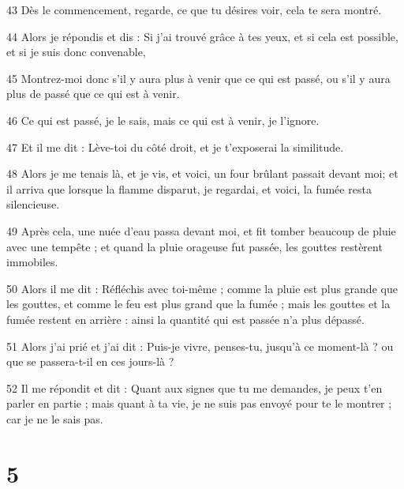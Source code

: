 \par 43 Dès le commencement, regarde, ce que tu désires voir, cela te sera montré.
\par 44 Alors je répondis et dis : Si j'ai trouvé grâce à tes yeux, et si cela est possible, et si je suis donc convenable,
\par 45 Montrez-moi donc s'il y aura plus à venir que ce qui est passé, ou s'il y aura plus de passé que ce qui est à venir.
\par 46 Ce qui est passé, je le sais, mais ce qui est à venir, je l'ignore.
\par 47 Et il me dit : Lève-toi du côté droit, et je t'exposerai la similitude.
\par 48 Alors je me tenais là, et je vis, et voici, un four brûlant passait devant moi; et il arriva que lorsque la flamme disparut, je regardai, et voici, la fumée resta silencieuse.
\par 49 Après cela, une nuée d'eau passa devant moi, et fit tomber beaucoup de pluie avec une tempête ; et quand la pluie orageuse fut passée, les gouttes restèrent immobiles.
\par 50 Alors il me dit : Réfléchis avec toi-même ; comme la pluie est plus grande que les gouttes, et comme le feu est plus grand que la fumée ; mais les gouttes et la fumée restent en arrière : ainsi la quantité qui est passée n'a plus dépassé.
\par 51 Alors j'ai prié et j'ai dit : Puis-je vivre, penses-tu, jusqu'à ce moment-là ? ou que se passera-t-il en ces jours-là ?
\par 52 Il me répondit et dit : Quant aux signes que tu me demandes, je peux t'en parler en partie ; mais quant à ta vie, je ne suis pas envoyé pour te le montrer ; car je ne le sais pas.

\chapter{5}


